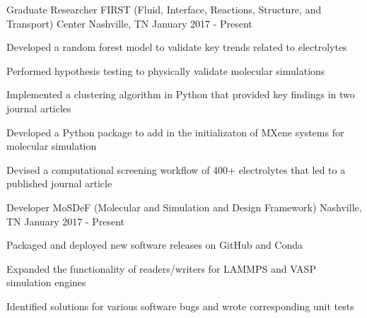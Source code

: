 
\begin{cventries}
  \cventry
    {Graduate Researcher} %
    {FIRST (Fluid, Interface, Reactions, Structure, and Transport) Center} %
    {Nashville, TN} %
    {January 2017 - Present} %
    {
      \begin{cvitems} %
        \item {Developed a random forest model to validate key trends related to
            electrolytes}
        \item {Performed hypothesis testing to physically validate molecular simulations}
        \item {Implemented a clustering algorithm in Python that
            provided key findings in two journal articles}
        \item {Developed a Python package to add in the initializaton of 
            MXene systems for molecular simulation}
        \item {Devised a computational screening workflow of 400+ 
            electrolytes that led to a published journal article}
      \end{cvitems}
    }

  \cventry
    {Developer} %
    {MoSDeF (Molecular and Simulation and Design Framework)} %
    {Nashville, TN} %
    {January 2017 - Present} %
    {
      \begin{cvitems} %
      \item {Packaged and deployed new software releases on GitHub and Conda}
        \item {Expanded the functionality of readers/writers for LAMMPS and VASP simulation engines}
        \item {Identified solutions for various software bugs and wrote
            corresponding unit tests}
      \end{cvitems}
    }
\end{cventries}
